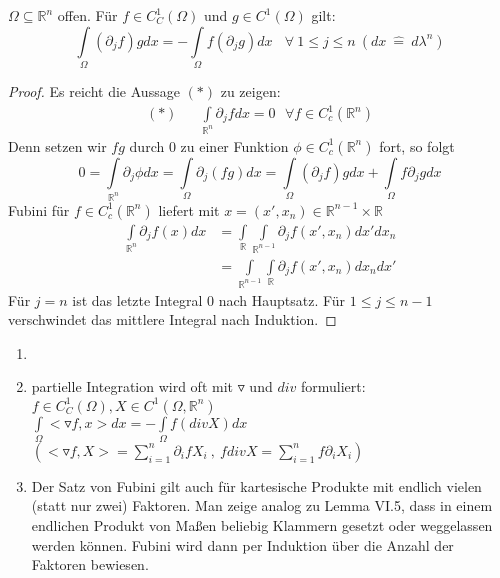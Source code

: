   \begin{theorem}
    $\Omega \subseteq \mathbb{R}^n$ offen. Für $f \in C_C^1(\Omega)$ und $g \in C^1(\Omega)$ gilt:
    $$\int\limits_{\Omega}(\partial_j f)g dx = -\int\limits_{\Omega} f (\partial_j g) dx \ \ \ \ \forall \ 1 \leq j \leq n \ (dx \ \hat{=} \ d \lambda^n)$$
  \end{theorem}
  \begin{proof}
    Es reicht die Aussage $(\ast)$ zu zeigen: 
    \begin{align*}
    	(\ast) && \int\limits_{\mathbb{R}^n} \partial_j f dx = 0 \text{   } \forall f\in C_c^1 (\mathbb{R}^n)
    \end{align*}
	Denn setzen wir $fg$ durch $0$ zu einer Funktion $\phi \in C^1_c(\mathbb{R}^n)$ fort, so folgt $$ 0 = \int\limits_{\mathbb{R}^n} \partial_j \phi dx = \int\limits_\Omega \partial_j (fg) dx = \int\limits_\Omega (\partial_j f) g dx + \int\limits_\Omega f \partial_j g dx$$
	Fubini für $f\in C^1_c(\mathbb{R}^n)$ liefert mit $x = (x', x_n)\in \mathbb{R}^{n-1}\times \mathbb{R}$ 
	\begin{equation*}
		\begin{split}
			\int\limits_{\mathbb{R}^n} \partial_j f(x) dx &= \int\limits_{\mathbb{R}} \int\limits_{\mathbb{R}^{n-1}} \partial_j f(x',x_n) dx' dx_n \\
			&= \int\limits_{\mathbb{R}^{n-1}} \int\limits_{\mathbb{R}} \partial_j f(x',x_n) dx_n dx'
		\end{split}
	\end{equation*}
	Für $j=n$ ist das letzte Integral $0$ nach Hauptsatz. Für $1 \leq j \leq n-1$ verschwindet das mittlere Integral nach Induktion. 
  \end{proof}

  \begin{remark}
    \begin{enumerate}
      \item[]
      \item partielle Integration wird oft mit $\triangledown$ und $div$ formuliert:\\
        $f \in C_C^1(\Omega), X \in C^1(\Omega, \mathbb{R}^n)$\\
        $\int\limits_{\Omega} <\triangledown f, x> dx = -\int\limits_{\Omega} f (div X) dx$\\
        $(<\triangledown f, X> = \sum\limits_{i=1}^n \partial_i f X_i \ , \ f div X = \sum\limits_{i=1}^n f \partial_i X_i)$
      \item Der Satz von Fubini gilt auch für kartesische Produkte mit endlich vielen (statt nur zwei) Faktoren. Man zeige analog zu Lemma VI.5, dass in einem endlichen Produkt von Maßen beliebig Klammern gesetzt oder weggelassen werden können. Fubini wird dann per Induktion über die Anzahl der Faktoren bewiesen.
    \end{enumerate}
  \end{remark}
